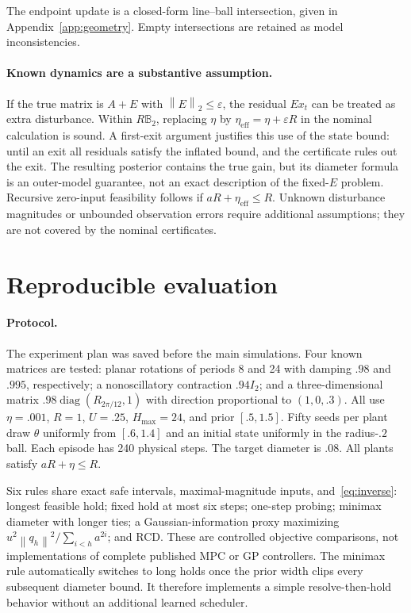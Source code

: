 \documentclass{l4dc2026}
\newcommand{\norm}[1]{\left\lVert #1\right\rVert}
\begin{document}
The endpoint update is a closed-form line--ball intersection, given in Appendix~\ref{app:geometry}. Empty intersections are retained as model inconsistencies.

\paragraph{Known dynamics are a substantive assumption.}
If the true matrix is $A+E$ with $\norm{E}_2\le\varepsilon$, the residual $Ex_t$ can be treated as extra disturbance. Within $R\mathbb B_2$, replacing $\eta$ by $\eta_{\mathrm{eff}}=\eta+\varepsilon R$ in the nominal calculation is sound. A first-exit argument justifies this use of the state bound: until an exit all residuals satisfy the inflated bound, and the certificate rules out the exit. The resulting posterior contains the true gain, but its diameter formula is an outer-model guarantee, not an exact description of the fixed-$E$ problem. Recursive zero-input feasibility follows if $aR+\eta_{\mathrm{eff}}\le R$. Unknown disturbance magnitudes or unbounded observation errors require additional assumptions; they are not covered by the nominal certificates.

\section{Reproducible evaluation}
\paragraph{Protocol.}
The experiment plan was saved before the main simulations. Four known matrices are tested: planar rotations of periods 8 and 24 with damping $.98$ and $.995$, respectively; a nonoscillatory contraction $.94I_2$; and a three-dimensional matrix $.98\operatorname{diag}(R_{2\pi/12},1)$ with direction proportional to $(1,0,.3)$. All use $\eta=.001$, $R=1$, $U=.25$, $H_{\max}=24$, and prior $[.5,1.5]$. Fifty seeds per plant draw $\theta$ uniformly from $[.6,1.4]$ and an initial state uniformly in the radius-$.2$ ball. Each episode has 240 physical steps. The target diameter is $.08$. All plants satisfy $aR+\eta\le R$.

Six rules share exact safe intervals, maximal-magnitude inputs, and~\eqref{eq:inverse}: longest feasible hold; fixed hold at most six steps; one-step probing; minimax diameter with longer ties; a Gaussian-information proxy maximizing $u^2\norm{q_h}^2/\sum_{i<h}a^{2i}$; and RCD. These are controlled objective comparisons, not implementations of complete published MPC or GP controllers. The minimax rule automatically switches to long holds once the prior width clips every subsequent diameter bound. It therefore implements a simple resolve-then-hold behavior without an additional learned scheduler.
\end{document}
